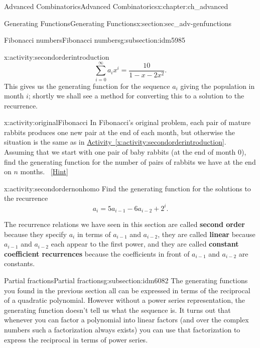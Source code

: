 \documentclass[oneside,10pt,]{book}
\newcommand{\terminology}[1]{\textbf{#1}}
\numberwithin{equation}{chapter}
\begin{document}
\begin{chapterptx}{Advanced Combinatorics}{}{Advanced Combinatorics}{}{}{x:chapter:ch_advanced}
\begin{sectionptx}{Generating Functions}{}{Generating Functions}{}{}{x:section:sec_adv-genfunctions}
\begin{subsectionptx}{Fibonacci numbers}{}{Fibonacci numbers}{}{}{g:subsection:idm5985}
\begin{activity}{}{x:activity:secondorderintroduction}
\begin{equation*}
\sum_{i=0}^\infty a_ix^i = \frac{10}{1-x-2x^2}.
\end{equation*}
This gives us the generating function for the sequence \(a_i\) giving the population in month \(i\); shortly we shall see a method for converting this to a solution to the recurrence.%
\end{activity}
\begin{activity}{}{x:activity:originalFibonacci}%
In Fibonacci's original problem, each pair of mature rabbits produces one new pair at the end of each month, but otherwise the situation is the same as in \hyperref[x:activity:secondorderintroduction]{Activity~\ref{x:activity:secondorderintroduction}}.  Assuming that we start with one pair of baby rabbits (at the end of month 0), find the generating function for the number of pairs of rabbits we have at the end on \(n\) months.%
\qquad~\hfill{\tiny\hyperlink{g:hint:idm6035-back}{[Hint]}}\end{activity}
\begin{activity}{}{x:activity:secondordernonhomo}%
Find the generating function for the solutions to the recurrence%
\begin{equation*}
a_i=5a_{i-1}-6a_{i-2} + 2^i.
\end{equation*}
%
\end{activity}
The recurrence relations we have seen in this section are called \terminology{second order} because they specify \(a_i\) in terms of \(a_{i-1}\) and \(a_{i-2}\), they are called \terminology{linear} because \(a_{i-1}\) and \(a_{i-2}\) each appear to the first power, and they are called \terminology{constant coefficient recurrences} because the coefficients in front of \(a_{i-1}\) and \(a_{i-2}\) are constants.%
\end{subsectionptx}
%
%
\typeout{************************************************}
\typeout{************************************************}
%
\begin{subsectionptx}{Partial fractions}{}{Partial fractions}{}{}{g:subsection:idm6082}
The generating functions you found in the previous section all can be expressed in terms of the reciprocal of a quadratic polynomial. However without a power series representation, the generating function doesn't tell us what the sequence is. It turns out that whenever you can factor a polynomial into linear factors (and over the complex numbers such a factorization always exists) you can use that factorization to express the reciprocal in terms of power series.%

\end{subsectionptx}
\end{sectionptx}
\end{chapterptx}
\end{document}
